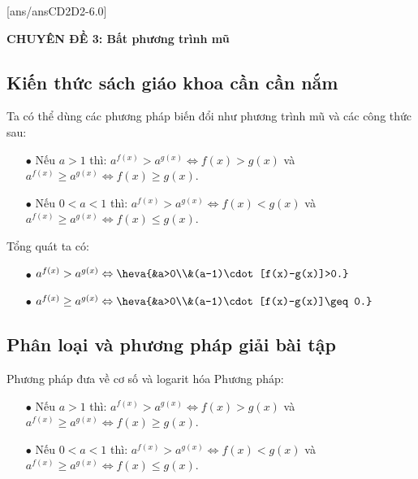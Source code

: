 [ans/ansCD2D2-6.0]
\begin{center}
	\textbf{CHUYÊN ĐỀ 3: Bất phương trình mũ}
\end{center}
\subsection{Kiến thức sách giáo khoa cần cần nắm}
Ta có thể dùng các phương pháp biến đổi như phương trình mũ và các công thức sau:
\begin{itemize}
	\item[$\bullet$] Nếu $a>1$ thì: $a^{f(x)}>a^{g(x)}\Leftrightarrow f(x)>g(x)$ và $a^{f(x)}\geq a^{g(x)}\Leftrightarrow f(x)\geq g(x)$.
	\item[$\bullet$] Nếu $0<a<1$ thì: $a^{f(x)}>a^{g(x)}\Leftrightarrow f(x)<g(x)$ và $a^{f(x)}\geq a^{g(x)}\Leftrightarrow f(x)\leq g(x)$.
\end{itemize}
Tổng quát ta có:
\begin{itemize}
	\item[$\bullet$] $a^{f(x)}>a^{g(x)}\Leftrightarrow\heva{&a>0\\&(a-1)\cdot [f(x)-g(x)]>0.}$
	\item[$\bullet$] $a^{f(x)}\geq a^{g(x)}\Leftrightarrow\heva{&a>0\\&(a-1)\cdot [f(x)-g(x)]\geq 0.}$
\end{itemize}
\subsection{Phân loại và phương pháp giải bài tập}
\begin{dang}{Phương pháp đưa về cơ số và logarit hóa}
	Phương pháp:
	\begin{itemize}
		\item[$\bullet$] Nếu $a>1$ thì: $a^{f(x)}>a^{g(x)}\Leftrightarrow f(x)>g(x)$ và $a^{f(x)}\geq a^{g(x)}\Leftrightarrow f(x)\geq g(x)$.
		\item[$\bullet$] Nếu $0<a<1$ thì: $a^{f(x)}>a^{g(x)}\Leftrightarrow f(x)<g(x)$ và $a^{f(x)}\geq a^{g(x)}\Leftrightarrow f(x)\leq g(x)$.
	\end{itemize}
\end{dang}

